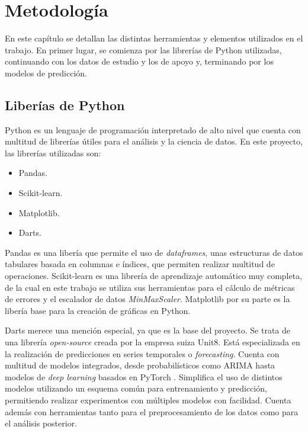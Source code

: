 \chapter{Metodología}\label{cap3}

En este capítulo se detallan las distintas herramientas y elementos utilizados en el trabajo. En primer lugar, se comienza por las librerías de Python utilizadas, continuando con los datos de estudio y los de apoyo y, terminando por los modelos de predicción.

\section{Liberías de Python}

Python \cite{python} es un lenguaje de programación interpretado de alto nivel que cuenta con multitud de librerías útiles para el análisis y la ciencia de datos. En este proyecto, las librerías utilizadas son:

\begin{itemize}
	\item Pandas.
	\item Scikit-learn.
	\item Matplotlib.
	\item Darts.
\end{itemize}

Pandas \cite{pandas} es una libería que permite el uso de \textit{dataframes}, unas estructuras de datos tabulares basada en columnas e índices, que permiten realizar multitud de operaciones. Scikit-learn \cite{scikit-learn} es una librería de aprendizaje automático muy completa, de la cual en este trabajo se utiliza sus herramientas para el cálculo de métricas de errores y el escalador de datos \textit{MinMaxScaler}. Matplotlib \cite{matplotlib} por su parte es la libería base para la creación de gráficas en Python.

Darts \cite{darts} merece una mención especial, ya que es la base del proyecto. Se trata de una librería \textit{open-source} creada por la empresa suiza Unit8. Está especializada en la realización de predicciones en series temporales o \textit{forecasting}. Cuenta con multitud de modelos integrados, desde probabilísticos como ARIMA hasta modelos de \textit{deep learning} basados en PyTorch \cite{pytorch}. Simplifica el uso de distintos modelos utilizando un esquema común para entrenamiento y predicción, permitiendo realizar experimentos con múltiples modelos con facilidad. Cuenta además con herramientas tanto para el preprocesamiento de los datos como para el análisis posterior.

